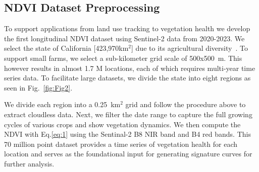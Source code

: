 \subsection{NDVI Dataset Preprocessing}
\label{dataset}
To support applications from land use tracking to vegetation health we develop the first longitudinal NDVI dataset using Sentinel-2 data from 2020-2023. We select the state of California [423,970km$^2$] due to its agricultural diversity~\cite{USDA1}. To support small farms, we select a sub-kilometer grid scale of 500x500~m. This however results in almost 1.7 M locations, each of which requires multi-year time series data. To facilitate large datasets, we divide the state into eight regions as seen in Fig.~\ref{fig:Fig2}. 

We divide each region into a 0.25~km$^2$ grid and follow the procedure above to extract cloudless data. Next, we filter the date range to capture the full growing cycles of various crops and show vegetation dynamics. We then compute the NDVI with Eq.\ref{eq:1} using the Sentinal-2 B8 NIR band and B4 red bands. This 70 million point dataset provides a time series of vegetation health for each location and serves as the foundational input for generating signature curves for further analysis.





